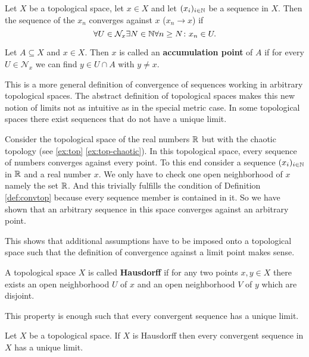 \begin{defin}\label{def:convtop}
  Let $X$ be a topological space, let $x \in X$ and let $(x_i)_{i \in \mathbb{N}}$ be a sequence in $X$. Then the sequence of the $x_n$ converges against $x$ ($x_n \to x$) if
  \begin{equation*}
    \forall U \in \mathcal{N}_x\exists N\in\mathbb{N}\forall n \geq N\colon x_n \in U.
  \end{equation*}

  Let $A \subseteq X$ and $x \in X$. Then $x$ is called an \textbf{accumulation point} of $A$ if for every $U \in \mathcal{N}_x$ we can find $y \in U \cap A$ with $y \neq x$.
\end{defin}
This is a more general definition of convergence of sequences working in arbitrary topological spaces. The abstract definition of topological spaces makes this new notion of limits not as intuitive as in the special metric case. In some topological spaces there exist sequences that do not have a unique limit.

\begin{ex}
  Consider the topological space of the real numbers $\mathbb{R}$ but with the chaotic topology (see \ref{ex:top} \ref{ex:top-chaotic}). In this topological space, every sequence of numbers converges against every point. To this end consider a sequence $(x_i)_{i\in\mathbb{N}}$ in $\mathbb{R}$ and a real number $x$. We only have to check one open neighborhood of $x$ namely the set $\mathbb{R}$. And this trivially fulfills the condition of Definition \ref{def:convtop} because every sequence member is contained in it. So we have shown that an arbitrary sequence in this space converges against an arbitrary point.  
\end{ex}

This shows that additional assumptions have to be imposed onto a topological space such that the definition of convergence against a limit point makes sense.

\begin{defin}
  A topological space $X$ is called \textbf{Hausdorff} if for any two points $x, y \in X$ there exists an open neighborhood $U$ of $x$ and an open neighborhood $V$ of $y$ which are disjoint.   
\end{defin}

This property is enough such that every convergent sequence has a unique limit.

\begin{thm}
  Let $X$ be a topological space. If $X$ is Hausdorff then every convergent sequence in $X$ has a unique limit.
\end{thm}

